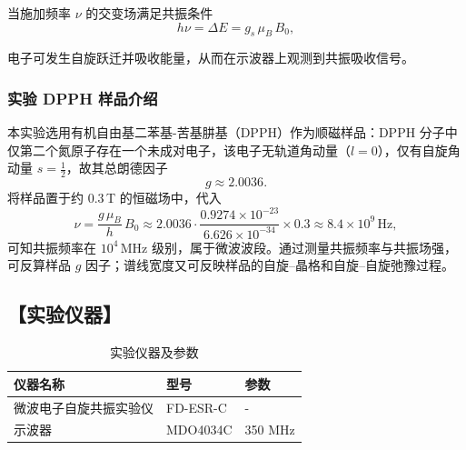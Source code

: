 \documentclass[12pt,a4paper,UTF8]{ctexart}
\begin{document}
当施加频率 \(\nu\) 的交变场满足共振条件
\[
h\nu = \Delta E = g_s\,\mu_B\,B_0,
\]

电子可发生自旋跃迁并吸收能量，从而在示波器上观测到共振吸收信号。

\subsubsection*{实验 DPPH 样品介绍}
本实验选用有机自由基二苯基-苦基肼基（DPPH）作为顺磁样品：DPPH 分子中仅第二个氮原子存在一个未成对电子，该电子无轨道角动量（\(l=0\)），仅有自旋角动量 \(s=\tfrac12\)，故其总朗德因子
\[
g \approx 2.0036.
\]
将样品置于约 \(0.3\)\,T 的恒磁场中，代入
\[
\nu = \frac{g\,\mu_B}{h}\,B_0
\approx 2.0036\cdot\frac{0.9274\times10^{-23}}{6.626\times10^{-34}}\times0.3
\approx 8.4\times10^9\,\mathrm{Hz},
\]
可知共振频率在 \(10^4\)\,MHz 级别，属于微波波段。通过测量共振频率与共振场强，可反算样品 \(g\) 因子；谱线宽度又可反映样品的自旋–晶格和自旋–自旋弛豫过程。

\subsection*{【实验仪器】}
\begin{table}[h!]
	\centering
	\begin{tabular}{|p{5cm} p{4cm} p{5cm}|}
		\hline
		仪器名称 & 型号 & 参数 \\
		\hline\hline
		微波电子自旋共振实验仪 & FD-ESR-C & - \\
		示波器 & MDO4034C &  350 MHz \\
		\hline		
	\end{tabular}
	\caption{实验仪器及参数}
	\label{tab:instruments}
\end{table}
\end{document}
